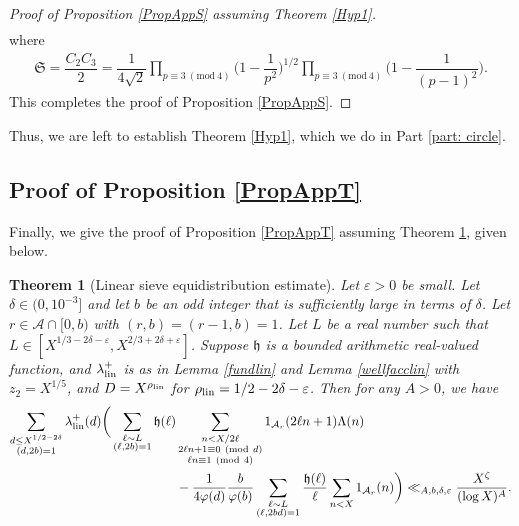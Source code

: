 \documentclass[12pt]{amsart}
\numberwithin{equation}{section}
\newtheorem{thm}{Theorem}
\theoremstyle{remark}
\theoremstyle{definition}
\newcommand{\imod}[1]{\ (\mathrm{mod}\ #1)}
\begin{document}
\begin{proof}[Proof of Proposition \ref{PropAppS} assuming Theorem \ref{Hyp1}]
\begin{align}
\end{align} 
where
\begin{align}
\label{mathfrakS} \mathfrak{S}=\dfrac{C_2C_3}{2}=\dfrac{1}{4\sqrt{2}}\prod_{p\equiv 3\imod 4}\bigg(1-\dfrac{1}{p^2}\bigg)^{1/2}\prod_{p\equiv 3\imod 4}\bigg(1-\dfrac{1}{(p-1)^2}\bigg).
\end{align}
This completes the proof of Proposition \ref{PropAppS}.
\end{proof}

Thus, we are left to establish Theorem \ref{Hyp1}, which we do in Part \ref{part: circle}.


\subsection{Proof of Proposition \ref{PropAppT}}

Finally, we give the proof of Proposition \ref{PropAppT} assuming Theorem \ref{Hyp2}, given below.

\begin{thm}[Linear sieve equidistribution estimate]\label{Hyp2}
Let $\varepsilon>0$ be small. Let $\delta\in (0, 10^{-3}]$ and let $b$ be an odd integer that is sufficiently large in terms of $\delta$. Let $r\in \mathcal{A}\cap[0,b)$ with $(r, b)=(r-1, b)=1$. Let $L$ be a real number such that $L\in[X^{1/3-2\delta-\varepsilon}, X^{2/3+2\delta + \varepsilon}]$. Suppose $\mathfrak{h}$ is a bounded arithmetic real-valued function, and $\lambda^+_{\textup{lin}}$ is as in Lemma \ref{fundlin} and Lemma \ref{wellfacclin} with $z_2=X^{1/5}$, and $D=X^{\rho_{\textup{lin}}}$ for $\rho_{\textup{lin}}=1/2-2\delta-\varepsilon$. Then for any $A>0$, we have
\begin{align}
\notag \sum_{\substack{d \leq X^{1/2-2\delta}\\(d,2b)=1}}\lambda^+_{\textup{lin}}(d)\bigg(\sum_{\substack{\ell\sim L\\(\ell,2b)=1}}\mathfrak{h}(\ell)&\sum_{\substack{n< X/2\ell\\2\ell n+1\equiv 0\imod {d}\\ \ell n\equiv 1\imod 4}}1_{\mathcal{A}_r}(2\ell n+1)\Lambda(n)\\
\label{hyp2eqn} &-\dfrac{1}{4\varphi(d)}\dfrac{b}{\varphi(b)}\sum_{\substack{\ell \sim L\\(\ell, 2bd)=1}}\dfrac{\mathfrak{h}(\ell)}{\ell}\sum_{n<X}1_{\mathcal{A}_r}(n)\bigg)\ll_{A, b, \delta, \varepsilon} \dfrac{X^{\zeta}}{(\log X)^A}.
\end{align}
\end{thm}
\end{document}
